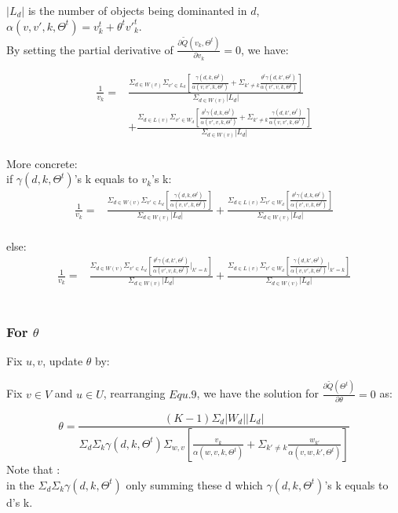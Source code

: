 \documentclass{article}
\begin{document}
 $|L_d|$ is the number of objects being dominanted in $d$,
 \\ $\alpha(v,v',k,\Theta^t)=v_k^t + \theta^t {v'}_k^t$.
 \\
By setting the partial derivative of $\frac{\partial \tilde{Q}(v_k,\Theta^t)}{\partial v_k}=0$, we have:



\begin{equation}
\begin{aligned}
\frac{1}{v_k}= &\frac{\Sigma_{d\in W(v)}\Sigma_{v'\in L_d} [\frac{\gamma(d,k,\Theta^t)}{ \alpha(v,v',k,\Theta^t)} +\Sigma_{k'\neq k}\frac{\theta^t\gamma(d,k',\Theta^t)}{\alpha(v',v,k,\Theta^t)}]}{\Sigma_{d\in W(v)}|L_d|}\\\nonumber
 & + \frac{\Sigma_{d\in L(v)}\Sigma_{v'\in W_d} [\frac{\theta^t \gamma(d,k,\Theta^t)}{\alpha(v',v,k,\Theta^t)}+\Sigma_{k'\neq k} \frac{\gamma(d,k',\Theta^t)}{\alpha(v,v',k,\Theta^t)}] }{\Sigma_{d\in W(v)}|L_d|}
\end{aligned}
\end{equation}\\

More concrete:\\
if $\gamma(d,k,\Theta^t)$'s k equals to $v_k $'s k:
\begin{equation*}
\begin{aligned}
\frac{1}{v_k}= &\frac{\Sigma_{d\in W(v)}\Sigma_{v'\in L_d} [\frac{\gamma(d,k,\Theta^t)}{ \alpha(v,v',k,\Theta^t)} ]}{\Sigma_{d\in W(v)}|L_d|}+ \frac{\Sigma_{d\in L(v)}\Sigma_{v'\in W_d} [\frac{\theta^t \gamma(d,k,\Theta^t)}{\alpha(v',v,k,\Theta^t)}] }{\Sigma_{d\in W(v)}|L_d|}
\end{aligned}
\end{equation*}\\
else:
\begin{equation*}
\begin{aligned}
\frac{1}{v_k}= &\frac{\Sigma_{d\in W(v)}\Sigma_{v'\in L_d} [\frac{\theta^t\gamma(d,k',\Theta^t)}{\alpha(v',v,k,\Theta^t)}|_{k'=k}]}{\Sigma_{d\in W(v)}|L_d|}+\frac{\Sigma_{d\in L(v)}\Sigma_{v'\in W_d} [\frac{\gamma(d,k',\Theta^t)}{\alpha(v,v',k,\Theta^t)}|_{k'=k}] }{\Sigma_{d\in W(v)}|L_d|}
\end{aligned}
\end{equation*}\\

\subsubsection{For $\theta$}
Fix $u,v$, update $\theta$ by:

  Fix $v \in V$ and $u \in U$, rearranging $Equ.9$, we have the solution for $\frac{\partial \tilde{Q}(\Theta^t)}{\partial \theta}=0$ as:

 \begin{equation}
\theta = \frac{(K-1)\Sigma_d |W_d| |L_d|}{\Sigma_d \Sigma_k \gamma(d,k,\Theta^t) \Sigma_{w,v} [\frac{v_k}{\alpha(w,v,k,\Theta^t)}+\Sigma_{k'\neq k} \frac{w_{k'}}{\alpha(v,w,k',\Theta^t)}]}
 \end{equation}
Note that :\\
in the $\Sigma_d \Sigma_k \gamma(d,k,\Theta^t)$ only summing these d which $\gamma(d,k,\Theta^t)$'s k equals to d's k.
\end{document}
